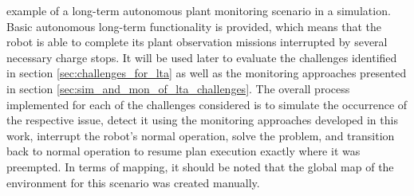 \documentclass[english, master, utf8]{base/thesis_KBS}
\begin{document}
example of a long-term autonomous plant monitoring scenario in a simulation. Basic autonomous long-term functionality is provided, which means that the robot is able to 
complete its plant observation missions interrupted by several necessary charge stops. It will be used later to evaluate the challenges identified in section 
\ref{sec:challenges_for_lta} as well as the monitoring approaches presented in section \ref{sec:sim_and_mon_of_lta_challenges}.
The overall process implemented for each of the challenges considered is to simulate the occurrence of the respective issue, detect it using
the monitoring approaches developed in this work, interrupt the robot's normal operation, solve the problem, and transition back to normal operation to resume 
plan execution exactly where it was preempted. In terms of mapping, it should be noted that the global map of the environment for this scenario was created manually.
\end{document}
